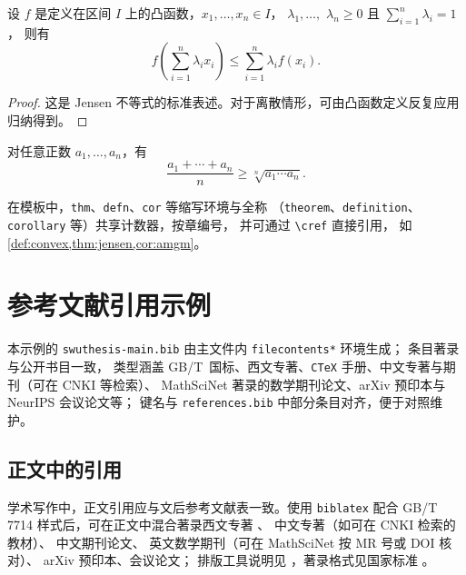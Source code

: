\begin{thm}[Jensen不等式]\label{thm:jensen}
设 $f$ 是定义在区间 $I$ 上的凸函数，$x_1,\dots,x_n\in I$，
$\lambda_1,\dots,$ $\lambda_n\ge 0$ 且 $\sum_{i=1}^{n}\lambda_i=1$，
则有
\[
f\!\left(\sum_{i=1}^{n}\lambda_i x_i\right)\le \sum_{i=1}^{n}\lambda_i f(x_i).
\]
\end{thm}

\begin{proof}
这是 Jensen 不等式的标准表述。对于离散情形，可由凸函数定义反复应用归纳得到。
\end{proof}

\begin{cor}\label{cor:amgm}
对任意正数 $a_1,\dots,a_n$，有
\[
\frac{a_1+\cdots+a_n}{n}\ge \sqrt[n]{a_1\cdots a_n}.
\]
\end{cor}

\begin{rmk}
在模板中，\texttt{thm}、\texttt{defn}、\texttt{cor} 等缩写环境与全称%
（\texttt{theorem}、\texttt{definition}、\texttt{corollary} 等）共享计数器，按章编号，%
并可通过 \texttt{\textbackslash cref} 直接引用，%
如 \cref{def:convex,thm:jensen,cor:amgm}。%
\end{rmk}

\chapter{参考文献引用示例}\label{ch:bib}

\noindent 本示例的 \texttt{swuthesis-main.bib} 由主文件内 \texttt{filecontents*} 环境生成；%
条目著录与公开书目一致，%
类型涵盖 GB/T~国标、西文专著、\texttt{CTeX} 手册、中文专著与期刊（可在 CNKI 等检索）、%
MathSciNet 著录的数学期刊论文、arXiv 预印本与 NeurIPS 会议论文等；%
键名与 \texttt{references.bib} 中部分条目对齐，便于对照维护。

\section{正文中的引用}
学术写作中，正文引用应与文后参考文献表一致。使用 \texttt{biblatex} 配合
GB/T 7714 样式后，可在正文中混合著录西文专著%
\cite{knuth1984texbook,lamport1994latex,mittelbach2004companion}、%
中文专著（如可在 CNKI 检索的教材）\cite{zhouzhihua2016ml}、%
中文期刊论文\cite{liguojie2012bigdata}、%
英文数学期刊（可在 MathSciNet 按 MR 号或 DOI 核对）\cite{WalpuskiZhang2021DMJ}、%
arXiv 预印本\cite{taubes2020compactness}、会议论文\cite{vaswani2017attention}；%
排版工具说明见 \cite{ctex2022}，著录格式见国家标准 \cite{gbt7714}。

